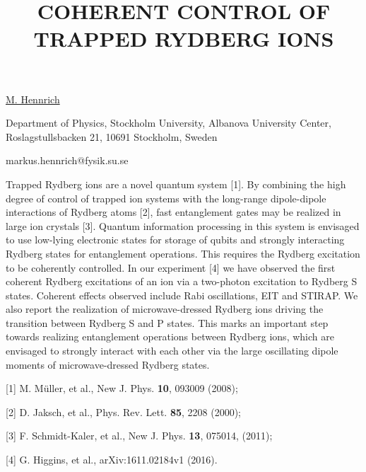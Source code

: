 \title{COHERENT CONTROL OF TRAPPED RYDBERG IONS}

\underline{M. Hennrich} 

{\normalsize{\vspace{-4mm}
Department of Physics, Stockholm University,
Albanova University Center,
Roslagstullsbacken 21,
10691 Stockholm, Sweden

\email markus.hennrich@fysik.su.se}}

Trapped Rydberg ions are a novel quantum system [1]. By combining the high degree of control of trapped ion systems with the long-range dipole-dipole interactions of Rydberg atoms [2], fast entanglement gates may be realized in large ion crystals [3].
Quantum information processing in this system is envisaged to use low-lying electronic states for storage of qubits and strongly interacting Rydberg states for entanglement operations. This requires the Rydberg excitation to be coherently controlled.
In our experiment [4] we have observed the first coherent Rydberg excitations of an ion via a two-photon excitation to Rydberg S states. Coherent effects observed include Rabi oscillations, EIT and STIRAP. We also report the realization of microwave-dressed Rydberg ions driving the transition between Rydberg S and P states. This marks an important step towards realizing entanglement operations between Rydberg ions, which are envisaged to strongly interact with each other via the large oscillating dipole moments of microwave-dressed Rydberg states.

{\normalsize
[1] M. Müller, et al., New J. Phys. \textbf{10}, 093009 (2008);
\vsp

[2] D. Jaksch, et al., Phys. Rev. Lett. \textbf{85}, 2208 (2000);
\vsp

[3] F. Schmidt-Kaler, et al., New J. Phys. \textbf{13}, 075014, (2011);
\vsp

[4] G. Higgins, et al., arXiv:1611.02184v1 (2016).
}

\vspace{\baselineskip} 